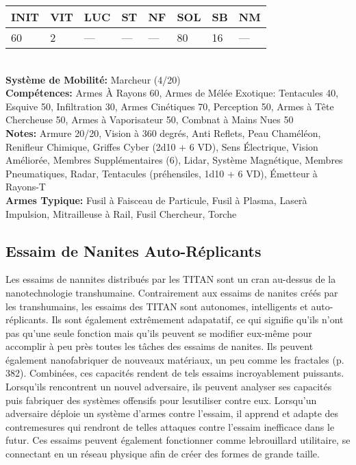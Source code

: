 {\begin{tabular}{|l|l|l|l|l|l|l|l|}
INIT &VIT &LUC &ST &NF &SOL &SB &NM \\ \hline

60 &2 &— &— &— &80 &16 &— \\ \hline

\end{tabular} \\ \textbf{Système de Mobilité: }Marcheur (4/20) \\ \textbf{Compétences:} Armes À Rayons 60, Armes de Mélée Exotique: Tentacules 40, Esquive 50, Infiltration 30, Armes Cinétiques 70, Perception 50, Armes à Tête Chercheuse 50, Armes à Vaporisateur 50, Combnat à Mains Nues 50 \\ \textbf{Notes:} Armure 20/20, Vision à 360 degrés, Anti Reflets, Peau Chaméléon, Renifleur Chimique, Griffes Cyber (2d10 + 6 VD), Sens Électrique, Vision Améliorée, Membres Supplémentaires (6), Lidar, Système Magnétique, Membres Pneumatiques, Radar, Tentacules (préhensiles, 1d10 + 6 VD), Émetteur à Rayons-T\\ \textbf{Armes Typique:} Fusil à Faisceau de Particule, Fusil à Plasma, Laserà Impulsion, Mitrailleuse à Rail, Fusil Chercheur, Torche 



\subsection{Essaim de Nanites Auto-Réplicants} 

Les essaims de nannites distribués par les TITAN sont un cran au-dessus de la nanotechnologie transhumaine. Contrairement aux essaims de nanites créés par les transhumains, les essaims des TITAN sont autonomes, intelligents et auto-réplicants. Ils sont également extrêmement adapatatif, ce qui signifie qu'ils n'ont pas qu'une seule fonction mais qu'ils peuvent se modifier eux-même pour accomplir à peu près toutes les tâches des essaims de nanites. Ils peuvent également nanofabriquer de nouveaux matériaux, un peu comme les fractales (p. 382). Combinées, ces capacités rendent de tels essaims incroyablement puissants. Lorsqu'ils rencontrent un nouvel adversaire, ils peuvent analyser ses capacités puis fabriquer des systèmes offensifs pour lesutiliser contre eux. Lorsqu'un adversaire déploie un système d'armes contre l'essaim, il apprend et adapte des contremesures qui rendront de telles attaques contre l'essaim inefficace dans le futur. Ces essaims peuvent également fonctionner comme lebrouillard utilitaire, se connectant en un réseau physique afin de créer des formes de grande taille. 

}
